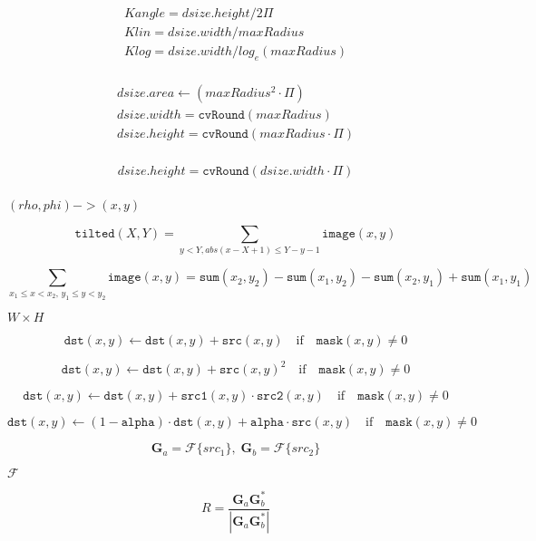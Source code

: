 \documentclass{article}
\begin{document}
\[ \begin{array}{l} Kangle = dsize.height / 2\Pi \\ Klin = dsize.width / maxRadius \\ Klog = dsize.width / log_e(maxRadius) \\ \end{array} \]
\pagebreak

\[\begin{array}{l} dsize.area \leftarrow (maxRadius^2 \cdot \Pi) \\ dsize.width = \texttt{cvRound}(maxRadius) \\ dsize.height = \texttt{cvRound}(maxRadius \cdot \Pi) \\ \end{array}\]
\pagebreak

\[\begin{array}{l} dsize.height = \texttt{cvRound}(dsize.width \cdot \Pi) \\ \end{array} \]
\pagebreak

$(rho, phi)->(x, y)$
\pagebreak

\[\texttt{tilted} (X,Y) = \sum _{y<Y,abs(x-X+1) \leq Y-y-1} \texttt{image} (x,y)\]
\pagebreak

\[\sum _{x_1 \leq x < x_2, \, y_1 \leq y < y_2} \texttt{image} (x,y) = \texttt{sum} (x_2,y_2)- \texttt{sum} (x_1,y_2)- \texttt{sum} (x_2,y_1)+ \texttt{sum} (x_1,y_1)\]
\pagebreak

$W \times H$
\pagebreak

\[\texttt{dst} (x,y) \leftarrow \texttt{dst} (x,y) + \texttt{src} (x,y) \quad \text{if} \quad \texttt{mask} (x,y) \ne 0\]
\pagebreak

\[\texttt{dst} (x,y) \leftarrow \texttt{dst} (x,y) + \texttt{src} (x,y)^2 \quad \text{if} \quad \texttt{mask} (x,y) \ne 0\]
\pagebreak

\[\texttt{dst} (x,y) \leftarrow \texttt{dst} (x,y) + \texttt{src1} (x,y) \cdot \texttt{src2} (x,y) \quad \text{if} \quad \texttt{mask} (x,y) \ne 0\]
\pagebreak

\[\texttt{dst} (x,y) \leftarrow (1- \texttt{alpha} ) \cdot \texttt{dst} (x,y) + \texttt{alpha} \cdot \texttt{src} (x,y) \quad \text{if} \quad \texttt{mask} (x,y) \ne 0\]
\pagebreak

\[\mathbf{G}_a = \mathcal{F}\{src_1\}, \; \mathbf{G}_b = \mathcal{F}\{src_2\}\]
\pagebreak

$\mathcal{F}$
\pagebreak

\[R = \frac{ \mathbf{G}_a \mathbf{G}_b^*}{|\mathbf{G}_a \mathbf{G}_b^*|}\]
\pagebreak
\end{document}

